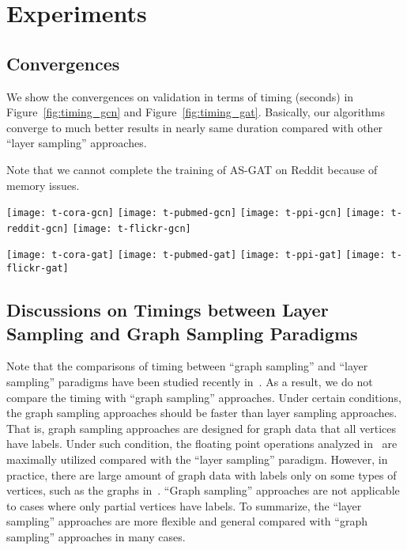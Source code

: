 \documentclass{article}
\begin{document}
\section{Experiments}


\subsection{Convergences}\label{appendix:convergences}
We show the convergences on validation in terms of timing (seconds)
in Figure~\ref{fig:timing_gcn} and Figure~\ref{fig:timing_gat}. Basically, our algorithms converge
to much better results in nearly same duration compared with other
``layer sampling'' approaches.

Note that we cannot complete the training of AS-GAT on Reddit
because of memory issues.

\begin{figure*}[h]
\texttt{[image: t-cora-gcn]}
\texttt{[image: t-pubmed-gcn]}
\texttt{[image: t-ppi-gcn]}
\texttt{[image: t-reddit-gcn]}
\texttt{[image: t-flickr-gcn]}
\caption{The convergence in timing (seconds) on GCNs.}
\label{fig:timing_gcn}
\end{figure*}

\begin{figure*}[h]
\texttt{[image: t-cora-gat]}
\texttt{[image: t-pubmed-gat]}
\texttt{[image: t-ppi-gat]}
\texttt{[image: t-flickr-gat]}
\caption{The convergence in timing (seconds) on attentive GNNs.}
\label{fig:timing_gat}
\end{figure*}
\subsection{Discussions on Timings between Layer Sampling and Graph Sampling Paradigms}\label{appendix:layer_vs_graph}

Note that the comparisons of 
timing between ``graph sampling'' and ``layer sampling'' 
paradigms have been studied recently in~\cite{chiang2019cluster,zeng2019graphsaint}.
As a result, we do not compare the timing with ``graph sampling'' approaches.
Under certain conditions, the graph sampling approaches 
should be faster than layer sampling approaches. That is, graph sampling approaches
are designed for graph data that all vertices have labels.
Under such condition, the floating point operations analyzed in~\cite{chiang2019cluster}
are maximally utilized compared with the ``layer sampling'' paradigm.
However, in practice, there are large amount of graph data with labels
only on some types of vertices, such as the graphs in~\cite{liu2018heterogeneous}.
``Graph sampling'' approaches
are not applicable to cases where only partial vertices have labels.
To summarize, the
``layer sampling'' approaches are more flexible
and general compared with ``graph sampling''
approaches in many cases.
\end{document}

